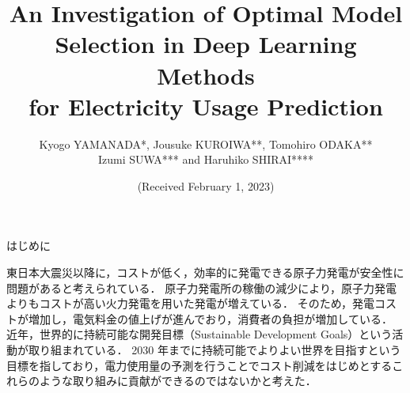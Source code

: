 \documentclass[twocolumn,fleqn,10pt]{jarticle}
\title{%
\vspace{-4mm}
{\titlefont
An Investigation of Optimal Model Selection in Deep Learning Methods \\ for Electricity Usage Prediction
}\\
}
\author{%
Kyogo YAMANADA*,{\hspace{3mm}}
Jousuke KUROIWA**,
Tomohiro ODAKA**\\
Izumi SUWA*** and
Haruhiko SHIRAI****
\vspace{2mm}
}
\date{
\normalsize (Received February 1, 2023)
\vspace{-3mm}
}
\makeatletter
\renewcommand{\section}{\@startsection
{section}{3}{0mm}{5mm}{5mm}{\bfseries \normalsize}}
\renewcommand{\subsection}{\@startsection
{subsection}{3}{0mm}{5mm}{0.01pt}{\bfseries \normalsize}}
\renewcommand{\thefootnote}{\fnsymbol{footnote}}%
\makeatother
\begin{document}
\maketitle
{} 
\renewcommand*{\thefootnote}{**}
\renewcommand*{\thefootnote}{***}
\renewcommand*{\thefootnote}{****}


\thispagestyle{empty}
\pagestyle{empty}










\section{はじめに}

東日本大震災以降に，コストが低く，効率的に発電できる原子力発電が安全性に問題があると考えられている．
原子力発電所の稼働の減少により，原子力発電よりもコストが高い火力発電を用いた発電が増えている．
そのため，発電コストが増加し，電気料金の値上げが進んでおり，消費者の負担が増加している．
近年，世界的に持続可能な開発目標（Sustainable Development Goals）という活動が取り組まれている．
2030 年までに持続可能でよりよい世界を目指すという目標を指しており，電力使用量の予測を行うことでコスト削減をはじめとするこれらのような取り組みに貢献ができるのではないかと考えた．
\end{document}
